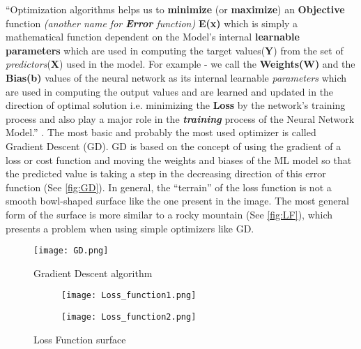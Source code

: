 “Optimization algorithms helps us to \textbf{minimize} (or \textbf{maximize}) an \textbf{Objective} function
\textit{(another name for \textbf{Error} function)} \textbf{E(x)} which is simply a mathematical function dependent on the Model’s internal \textbf{learnable parameters}
which are used in computing the target values(\textbf{Y}) from the set of \textit{predictors}(\textbf{X}) used in the model. 
For example - we call the \textbf{Weights(W)} and the \textbf{Bias(b)} values of the neural network as its internal learnable \textit{parameters} 
which are used in computing the output values and are learned and updated in the direction of optimal solution i.e. 
minimizing the \textbf{Loss} by the network’s training process and also play a major role in the \textit{\textbf{training}} process of the Neural Network Model.” \cite{optimizaiton_algorithms}.
The most basic and probably the most used optimizer is called Gradient Descent (GD). 
GD is based on the concept of using the gradient of a loss or cost function and moving the weights and biases of the ML model so that the predicted value is taking a step in the decreasing direction of this error function 
(See \autoref{fig:GD}). In general, the “terrain” of the loss function is not a smooth bowl-shaped surface like the one present in the image. The most general form of the surface is more similar to a rocky mountain (See \autoref{fig:LF}), which presents a problem when using simple optimizers like GD.


\begin{figure}
\begin{center}

\texttt{[image: GD.png]}
\caption{Gradient Descent algorithm\label{fig:GD}}
\end{center}

\end{figure}



\begin{figure}
\begin{center}

\begin{subfigure}{.9\linewidth}
\texttt{[image: Loss\_function1.png]}
\end{subfigure}

\begin{subfigure}{.9\linewidth}
\texttt{[image: Loss\_function2.png]}
\end{subfigure}

\caption{Loss Function surface\label{fig:LF}}
\end{center}

\end{figure}


